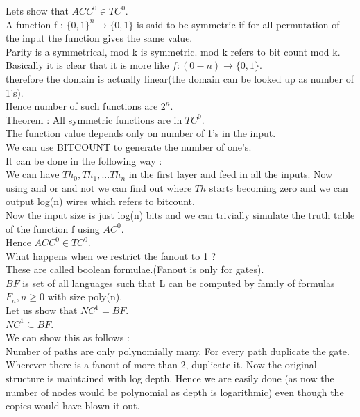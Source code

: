 \documentclass[solution,addpoints,12pt]{exam}
\begin{document}
Lets show that ${ACC}^0 \in {TC}^0$.\\
A function f : ${\{0, 1\}}^n \rightarrow \{0, 1\}$
is said to be symmetric if for all permutation
of the input the function gives the same value.\\
Parity is a symmetrical, mod k is symmetric. mod k refers
to bit count mod k.\\
Basically it is clear that it is more like $f : (0-n) \rightarrow \{0, 1\}$.\\
therefore the domain is actually linear(the domain can be looked up as
number of 1's).\\
Hence number of such functions are $2^n$.\\
Theorem : All symmetric functions are in ${TC}^0$.\\
The function value depends only on number of 1's in the input.\\
We can use BITCOUNT to generate the number of one's.\\
It can be done in the following way :\\
We can have $Th_0, Th_1, ... Th_n$  in the first layer and feed in
all the inputs. Now using and or and not we can find out where
$Th$ starts becoming zero and we can output log(n) wires which refers
to bitcount.\\
Now the input size is just log(n) bits and we can trivially simulate
the truth table of the function f using ${AC}^0$.\\

Hence ${ACC}^0 \in {TC}^0$.\\

What happens when we restrict the fanout to 1 ?\\
These are called boolean formulae.(Fanout is only for gates).\\
$BF$ is set of all languages such that L can be computed
by family of formulas $F_n, n \ge 0$ with size poly(n).\\
Let us show that ${NC}^1 = BF$.\\
${NC}^1 \subseteq BF$.\\
We can show this as follows :\\
Number of paths are only polynomially many. For
every path duplicate the gate. Wherever
there is a fanout of more than 2, duplicate it. Now
the original structure is maintained with log depth.
Hence we are easily done (as now the number of nodes would
be polynomial as depth is logarithmic) even though the copies
would have blown it out.\\
\end{document}
